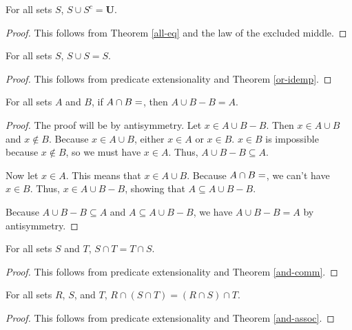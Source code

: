 \documentclass[../math.tex]{subfiles}
\begin{document}
\begin{theorem} \label{union-compl-all}
    For all sets $S$, $S \cup S^c = \bm U$.
\end{theorem}
\begin{proof}
    This follows from Theorem \ref{all-eq} and the law of the excluded middle.
\end{proof}

\begin{theorem} \label{union-idemp}
    For all sets $S$, $S \cup S = S$.
\end{theorem}
\begin{proof}
    This follows from predicate extensionality and Theorem \ref{or-idemp}.
\end{proof}

\begin{theorem} \label{union-minus}
    For all sets $A$ and $B$, if $A \cap B = \empty$, then $A \cup B - B = A$.
\end{theorem}
\begin{proof}
    The proof will be by antisymmetry.  Let $x \in A \cup B - B$.  Then $x \in A
    \cup B$ and $x \notin B$.  Because $x \in A \cup B$, either $x \in A$ or $x
    \in B$.  $x \in B$ is impossible because $x \notin B$, so we must have $x \in
    A$.  Thus, $A \cup B - B \subseteq A$.

    Now let $x \in A$.  This means that $x \in A \cup B$.  Because $A \cap B =
    \empty$, we can't have $x \in B$.  Thus, $x \in A \cup B - B$, showing that
    $A \subseteq A \cup B - B$.

    Because $A \cup B - B \subseteq A$ and $A \subseteq A \cup B - B$, we have
    $A \cup B - B = A$ by antisymmetry.
\end{proof}

\begin{theorem} \label{inter-comm}
    For all sets $S$ and $T$, $S \cap T = T \cap S$.
\end{theorem}
\begin{proof}
    This follows from predicate extensionality and Theorem \ref{and-comm}.
\end{proof}

\begin{theorem} \label{inter-assoc}
    For all sets $R$, $S$, and $T$, $R \cap (S \cap T) = (R \cap S) \cap T$.
\end{theorem}
\begin{proof}
    This follows from predicate extensionality and Theorem \ref{and-assoc}.
\end{proof}
\end{document}
